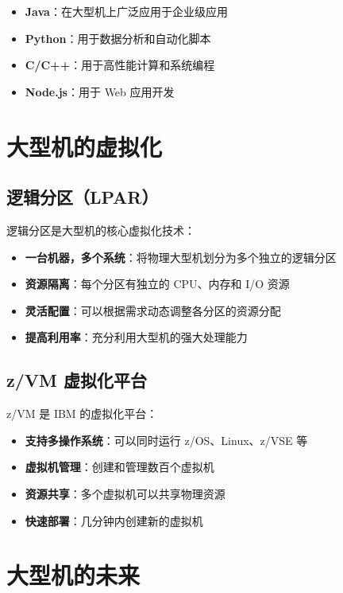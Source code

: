 \documentclass[12pt,UTF8]{ctexbook}
\begin{document}
\begin{itemize}[leftmargin=2cm]
    \item \textbf{Java}：在大型机上广泛应用于企业级应用
    \item \textbf{Python}：用于数据分析和自动化脚本
    \item \textbf{C/C++}：用于高性能计算和系统编程
    \item \textbf{Node.js}：用于 Web 应用开发
\end{itemize}

\chapter{大型机的虚拟化}
\label{chap:virtualization}

\section{逻辑分区（LPAR）}

逻辑分区是大型机的核心虚拟化技术：

\begin{itemize}[leftmargin=2cm]
    \item \textbf{一台机器，多个系统}：将物理大型机划分为多个独立的逻辑分区
    \item \textbf{资源隔离}：每个分区有独立的 CPU、内存和 I/O 资源
    \item \textbf{灵活配置}：可以根据需求动态调整各分区的资源分配
    \item \textbf{提高利用率}：充分利用大型机的强大处理能力
\end{itemize}

\section{z/VM 虚拟化平台}

z/VM 是 IBM 的虚拟化平台：

\begin{itemize}[leftmargin=2cm]
    \item \textbf{支持多操作系统}：可以同时运行 z/OS、Linux、z/VSE 等
    \item \textbf{虚拟机管理}：创建和管理数百个虚拟机
    \item \textbf{资源共享}：多个虚拟机可以共享物理资源
    \item \textbf{快速部署}：几分钟内创建新的虚拟机
\end{itemize}

\chapter{大型机的未来}
\label{chap:future}
\end{document}
